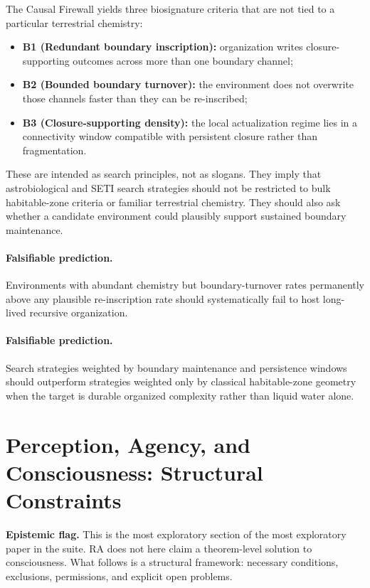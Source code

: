\documentclass[11pt]{article}
\begin{document}
The Causal Firewall yields three biosignature criteria that are not tied to a particular terrestrial chemistry:
\begin{itemize}[nosep]
    \item \textbf{B1 (Redundant boundary inscription):} organization writes closure-supporting outcomes across more than one boundary channel;
    \item \textbf{B2 (Bounded boundary turnover):} the environment does not overwrite those channels faster than they can be re-inscribed;
    \item \textbf{B3 (Closure-supporting density):} the local actualization regime lies in a connectivity window compatible with persistent closure rather than fragmentation.
\end{itemize}

These are intended as search principles, not as slogans. They imply that astrobiological and SETI search strategies should not be restricted to bulk habitable-zone criteria or familiar terrestrial chemistry. They should also ask whether a candidate environment could plausibly support sustained boundary maintenance.

\paragraph{Falsifiable prediction.} Environments with abundant chemistry but boundary-turnover rates permanently above any plausible re-inscription rate should systematically fail to host long-lived recursive organization.

\paragraph{Falsifiable prediction.} Search strategies weighted by boundary maintenance and persistence windows should outperform strategies weighted only by classical habitable-zone geometry when the target is durable organized complexity rather than liquid water alone.

\section{Perception, Agency, and Consciousness: Structural Constraints}
\label{sec:consciousness}

\textbf{Epistemic flag.} This is the most exploratory section of the most exploratory paper in the suite. RA does not here claim a theorem-level solution to consciousness. What follows is a structural framework: necessary conditions, exclusions, permissions, and explicit open problems.
\end{document}
